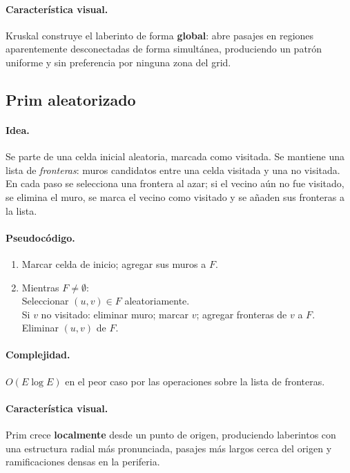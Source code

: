 \documentclass[12pt,a4paper]{article}
\begin{document}
\paragraph{Característica visual.}
Kruskal construye el laberinto de forma \textbf{global}: abre pasajes
en regiones aparentemente desconectadas de forma simultánea, produciendo
un patrón uniforme y sin preferencia por ninguna zona del grid.

\subsection{Prim aleatorizado}

\paragraph{Idea.}
Se parte de una celda inicial aleatoria, marcada como visitada. Se
mantiene una lista de \emph{fronteras}: muros candidatos entre una
celda visitada y una no visitada. En cada paso se selecciona una
frontera al azar; si el vecino aún no fue visitado, se elimina el muro,
se marca el vecino como visitado y se añaden sus fronteras a la lista.

\paragraph{Pseudocódigo.}
\begin{enumerate}
  \item Marcar celda de inicio;\; agregar sus muros a $F$.
  \item Mientras $F \neq \emptyset$:\\
        \quad Seleccionar $(u,v)\in F$ aleatoriamente.\\
        \quad Si $v$ no visitado: eliminar muro;\; marcar $v$;\;
        agregar fronteras de $v$ a $F$.\\
        \quad Eliminar $(u,v)$ de $F$.
\end{enumerate}

\paragraph{Complejidad.}
$O(E\log E)$ en el peor caso por las operaciones sobre la lista de
fronteras.

\paragraph{Característica visual.}
Prim crece \textbf{localmente} desde un punto de origen, produciendo
laberintos con una estructura radial más pronunciada, pasajes más
largos cerca del origen y ramificaciones densas en la periferia.
\end{document}
